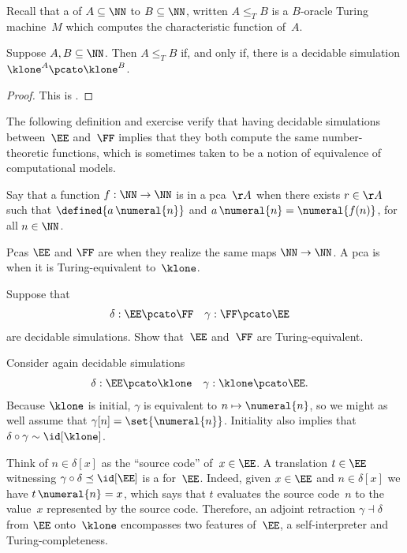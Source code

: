 Recall that a  of $A \subseteq \NN$ to $B \subseteq \NN$, written $A \leq_T B$ is a $B$-oracle Turing machine~$M$ which computes the characteristic function of~$A$.

\begin{theorem}
  Suppose $A, B \subseteq \NN$. Then $A \leq_T B$ if, and only if, there is a decidable simulation $\klone^A \pcato \klone^B$.
\end{theorem}

\begin{proof}
  This is \cite[Proposition 3.1.6]{Longley:94}.
\end{proof}

The following definition and exercise verify that having decidable simulations between~$\EE$ and~$\FF$ implies that they both compute the same number-theoretic functions, which is sometimes taken to be a notion of equivalence of computational models.

\begin{definition}
  Say that a function $f : \NN \to \NN$ is  in a pca~$\AA$ when there exists $r \in \AA$ such that $\defined{a \, \numeral{n}}$ and $a \, \numeral{n} = \numeral{f(n)}$, for all $n \in \NN$.

  Pcas $\EE$ and $\FF$ are  when they realize the same maps $\NN \to \NN$.
  A pca is  when it is Turing-equivalent to~$\klone$.
\end{definition}

\begin{exercise}
  Suppose that
  \begin{align*}
    \delta &: \EE \pcato \FF
    &
      \gamma &: \FF \pcato \EE
  \end{align*}
  are decidable simulations. Show that~$\EE$ and~$\FF$ are Turing-equivalent.
\end{exercise}

Consider again decidable simulations
%
\begin{align*}
  \delta &: \EE \pcato \klone
  &
  \gamma &: \klone \pcato \EE.
\end{align*}
%
Because $\klone$ is initial, $\gamma$ is equivalent to $n \mapsto \numeral{n}$, so we might as well assume that $\gamma[n] = \set{\numeral{n}}$. Initiality also implies that $\delta \circ \gamma \sim \id[\klone]$.

Think of $n \in \delta[x]$ as the ``source code'' of~$x \in \EE$.
%
A translation $t \in \EE$ witnessing $\gamma \circ \delta \preceq \id[\EE]$ is a  for~$\EE$. Indeed, given $x \in \EE$ and $n \in \delta[x]$ we have $t \, \numeral{n} = x$, which says that $t$ evaluates the source code~$n$ to the value~$x$ represented by the source code.
%
Therefore, an adjoint retraction $\gamma \dashv \delta$ from $\EE$ onto~$\klone$ encompasses two features of~$\EE$, a self-interpreter and Turing-completeness.

